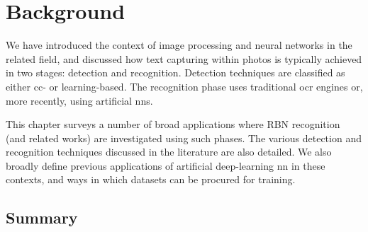\chapter{Background}
\label{ch:background}


We have introduced the context of image processing and neural networks in the related field, and discussed how text capturing within photos is typically achieved in two stages: detection and recognition. Detection techniques are classified as either \gls{cc}- or learning-based. The recognition phase uses traditional \gls{ocr} engines or, more recently, using artificial \glspl{nn}. 

This chapter surveys a number of broad applications where RBN recognition (and related works) are investigated using such phases. The various detection and recognition techniques discussed in the literature are also detailed. We also broadly define previous applications of artificial deep-learning \gls{nn} in these contexts, and ways in which datasets can be procured for training.







\section*{Summary}

